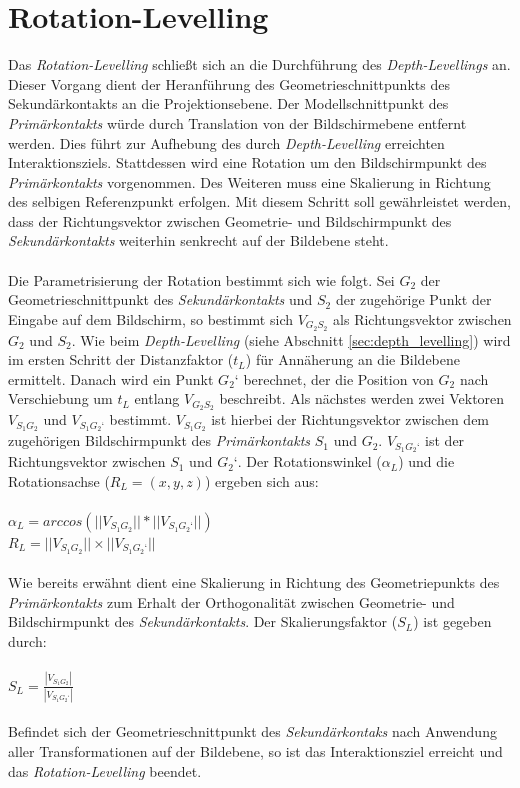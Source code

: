 \section{Rotation-Levelling}
\label{sec:rotation_levelling}

Das \emph{Rotation-Levelling} schließt sich an die Durchführung des \emph{Depth-Levellings} an. Dieser Vorgang dient der Heranführung des Geometrieschnittpunkts des Sekundärkontakts an die Projektionsebene. Der Modellschnittpunkt des \linebreak \emph{Primärkontakts} würde durch Translation von der Bildschirmebene entfernt werden. Dies führt zur Aufhebung des durch \emph{Depth-Levelling} erreichten Interaktionsziels. Stattdessen wird eine Rotation um den Bildschirmpunkt des \emph{Primärkontakts} vorgenommen. Des Weiteren muss eine Skalierung in Richtung des selbigen Referenzpunkt erfolgen. Mit diesem Schritt soll gewährleistet werden, dass der Richtungsvektor zwischen Geometrie- und Bildschirmpunkt des \emph{Sekundärkontakts} weiterhin senkrecht auf der Bildebene steht.
\\\\
Die Parametrisierung der Rotation bestimmt sich wie folgt.  Sei $G_2$ der Geometrieschnittpunkt des \emph{Sekundärkontakts} und $S_2$ der zugehörige Punkt der Eingabe auf dem Bildschirm, so bestimmt sich $V_{G_2S_2}$ als Richtungsvektor zwischen $G_2$ und $S_2$. Wie beim \emph{Depth-Levelling} (siehe Abschnitt \ref{sec:depth_levelling}) wird im ersten Schritt der Distanzfaktor ($t_L$) für Annäherung an die Bildebene ermittelt. Danach wird ein Punkt $G_2‘$ berechnet, der die Position von $G_2$ nach Verschiebung um $t_L$ entlang $V_{G_2S_2}$ beschreibt. Als nächstes werden zwei Vektoren $V_{S_1G_2}$ und $V_{S_1G_2‘}$ bestimmt. $V_{S_1G_2}$ ist hierbei der Richtungsvektor zwischen dem zugehörigen Bildschirmpunkt des \emph{Primärkontakts} $S_1$ und $G_2$. $V_{S_1G_2‘}$ ist der Richtungsvektor zwischen $S_1$ und $G_2‘$. Der Rotationswinkel ($\alpha_L$) und die Rotationsachse ($R_L = (x, y, z)$) ergeben sich aus:
\\\\
$\alpha_L = arccos(||V_{S_1G_2}|| * || V_{S_1G_2‘}||)$
\\
$R_L = ||V_{S_1G_2}|| \times ||V_{S_1G_2‘}||$ 
\\\\
Wie bereits erwähnt dient eine Skalierung in Richtung des Geometriepunkts des \emph{Primärkontakts} zum Erhalt der Orthogonalität zwischen Geometrie- und Bildschirmpunkt des \emph{Sekundärkontakts}. Der Skalierungsfaktor ($S_L$) ist gegeben durch:
\\\\
$S_L = \frac{|V_{S_1G_2}|}{|V_{S_1G_2‘}|}$
\\\\
Befindet sich der Geometrieschnittpunkt des \emph{Sekundärkontaks} nach Anwendung aller Transformationen auf der Bildebene, so ist das Interaktionsziel erreicht und das \emph{Rotation-Levelling} beendet.


